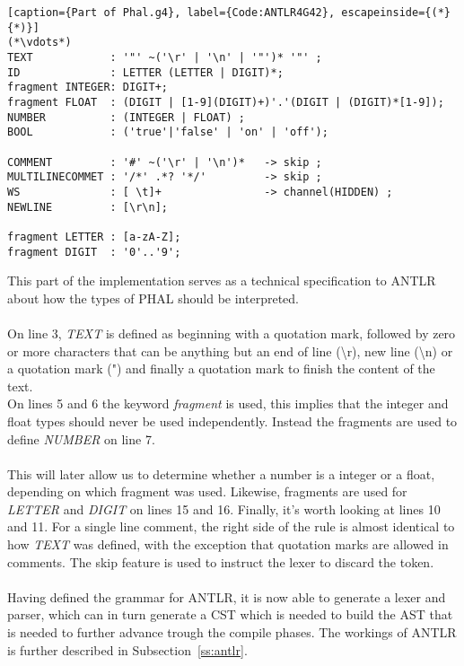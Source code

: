 \begin{lstlisting}[caption={Part of Phal.g4}, label={Code:ANTLR4G42}, escapeinside={(*}{*)}]
(*\vdots*)
TEXT            : '"' ~('\r' | '\n' | '"')* '"' ;
ID              : LETTER (LETTER | DIGIT)*;
fragment INTEGER: DIGIT+;
fragment FLOAT  : (DIGIT | [1-9](DIGIT)+)'.'(DIGIT | (DIGIT)*[1-9]);
NUMBER          : (INTEGER | FLOAT) ;
BOOL            : ('true'|'false' | 'on' | 'off'); 

COMMENT         : '#' ~('\r' | '\n')*   -> skip ;
MULTILINECOMMET : '/*' .*? '*/'         -> skip ;
WS              : [ \t]+                -> channel(HIDDEN) ;
NEWLINE         : [\r\n];

fragment LETTER : [a-zA-Z];
fragment DIGIT  : '0'..'9';
\end{lstlisting}
This part of the implementation serves as a technical specification to ANTLR about how the types of PHAL should be interpreted.
\\\\
On line 3, \textit{TEXT} is defined as beginning with a quotation mark, followed by zero or more characters that can be anything but an end of line (\textbackslash r), new line (\textbackslash n) or a quotation mark (") and finally a quotation mark to finish the content of the text.
\\
On lines 5 and 6 the keyword \textit{fragment} is used, this implies that the integer and float types should never be used independently. 
Instead the fragments are used to define \textit{NUMBER} on line 7.
\\\\
This will later allow us to determine whether a number is a integer or a float, depending on which fragment was used.
Likewise, fragments are used for \textit{LETTER} and \textit{DIGIT} on lines 15 and 16.
Finally, it's worth looking at lines 10 and 11. 
For a single line comment, the right side of the rule is almost identical to how \textit{TEXT} was defined, with the exception that quotation marks are allowed in comments. 
The skip feature is used to instruct the lexer to discard the token.
\\\\
Having defined the grammar for ANTLR, it is now able to generate a lexer and parser, which can in turn generate a CST which is needed to build the AST that is needed to further advance trough the compile phases. 
The workings of ANTLR is further described in Subsection~\ref{ss:antlr}.

